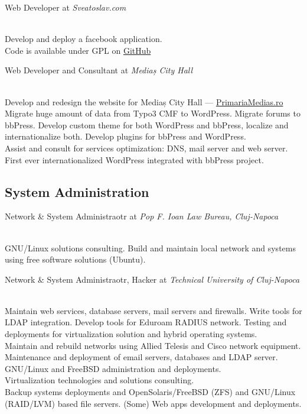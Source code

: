 \documentclass[10pt, a4paper]{article}
\newcommand{\years}[1]{\marginnote{\scriptsize #1}}
\begin{document}
\years{2009}Web Developer at \emph{Sveatoslav.com}
\begin{footnotesize}
\\
Develop and deploy a facebook application.\\
Code is available under GPL on \href{http://github.com/stas/facebook-ideas-app}{GitHub}
\end{footnotesize}

\years{2007}Web Developer and Consultant at \emph{Mediaș City Hall}
\begin{footnotesize}
\\
 Develop and redesign the website for Mediaș City Hall --- \href{http://primariamedias.ro}{PrimariaMedias.ro}\\
 Migrate huge amount of data from Typo3 CMF to WordPress. Migrate forums to bbPress. Develop custom theme for both WordPress and bbPress, localize and internationalize both. Develop plugins for bbPress and WordPress.\\
 Assist and consult for services optimization: DNS, mail server and web server.\\
 First ever internationalized WordPress integrated with bbPress project.
\end{footnotesize}

\subsection*{System Administration}
\noindent
\years{2009-present}Network \& System Administraotr at \emph{Pop F. Ioan Law Bureau, Cluj-Napoca}
\begin{footnotesize}
\\
GNU/Linux solutions consulting. Build and maintain local network and systems using free software solutions (Ubuntu).
\end{footnotesize}

\years{2008-2009}Network \& System Administraotr, Hacker at \emph{Technical University of Cluj-Napoca}
\begin{footnotesize}
\\
Maintain web services, database servers, mail servers and firewalls. Write tools for LDAP integration. Develop tools for Eduroam RADIUS network. Testing and deployments for virtualization solution and hybrid operating systems.\\
Maintain and rebuild networks using Allied Telesis and Cisco network equipment. Maintenance and deployment of email servers, databases and LDAP server.\\
GNU/Linux and FreeBSD administration and deployments.\\
Virtualization technologies and solutions consulting.\\
Backup systems deployments and OpenSolaris/FreeBSD (ZFS) and GNU/Linux (RAID/LVM) based file servers. (Some) Web apps development and deployments.
\end{footnotesize}
\end{document}
